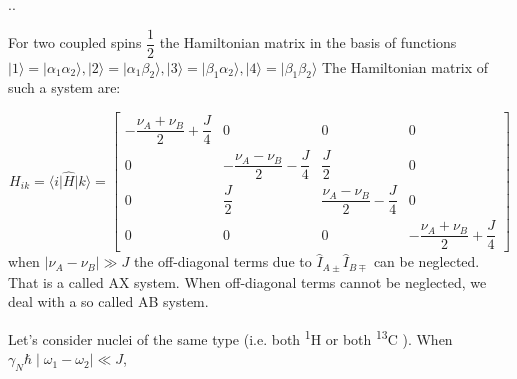 \documentclass[handout]{beamer}
\begin{document}
\begin{frame}{\thesection.\thesubsection. \insertsubsection}


		For two coupled spins $\dfrac{1}{2}$ the Hamiltonian matrix in the basis of functions $\vert 1 \rangle =  \vert \alpha_1 \alpha_2 \rangle, \vert 2 \rangle =  \vert \alpha_1 \beta_2 \rangle, \vert 3 \rangle =  \vert \beta_1 \alpha_2 \rangle, \vert 4 \rangle =  \vert \beta_1 \beta_2 \rangle$
		The Hamiltonian matrix of such a system are:
		
		{\tiny
		\begin{equation}
		  H_{ik}= \langle i \vert \hat{H} \vert k \rangle = 
		   \begin{bmatrix}
                 -\dfrac{\nu_A+ \nu_{B}  }{2} + \dfrac{J}{4}   & 0 & 0 & 0 \\
                 0 & -\dfrac{\nu_A-\nu_B}{2} - \dfrac{J}{4}  & \dfrac{J}{2} & 0 \\
                 0 & \dfrac{J}{2} & \dfrac{\nu_A-\nu_B}{2} - \dfrac{J}{4}  & 0 \\
                 0 & 0 & 0 & -\dfrac{\nu_A+\nu_B}{2} + \dfrac{J}{4}                  
		   \end{bmatrix}
		\end{equation}
	    }%
	    when $\mid \nu_A -\nu_B \mid \gg J $ the off-diagonal terms due to $\hat{I}_{A\pm} \hat{I}_{B\mp}$ can be neglected. That is a called \alert{AX system}. When off-diagonal terms cannot be neglected, we deal with a so called \alert{AB system}.
	
		
		Let's consider nuclei of the same type (i.e. both \textsuperscript{1}H or both \textsuperscript{13}C ). When $\gamma_N \hbar \mid \omega_1 -\omega_2 \mid \ll J $,
		

	
	
\end{frame}
\end{document}
